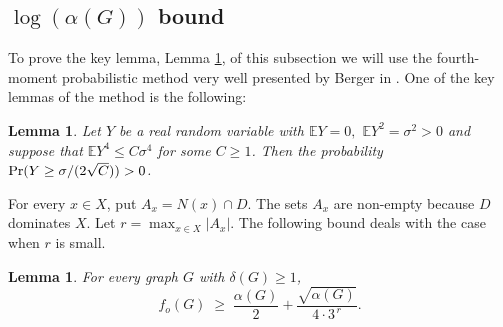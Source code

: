 \documentclass[11pt]{article}
\newtheorem{lemma}[theorem]{Lemma}
\theoremstyle{definition}
\theoremstyle{remark}
\newcommand{\E}{\mathbb E}
\newcommand{\1}{\mathbf{1}}
\begin{document}
	\subsection{$\log(\alpha(G))$ bound}
	
	To prove the key lemma, Lemma \ref{lem:bound1}, of this subsection we will use the fourth-moment probabilistic method very well presented by Berger in \cite{Berger1997}. One of the key lemmas of the method is the following:
	\begin{lemma}\label{lem:fourth-moment}\cite{Berger1997}
		Let $Y$ be a real random variable with
		$\E Y=0,$ $\E Y^2=\sigma^2>0$
		and suppose that
		$
		\E Y^4\le C\sigma^4
		$
		for some $C\ge 1$. Then the probability ${\rm Pr}(Y\ge \sigma/(2\sqrt C))>0$.
	\end{lemma}
	
	
	
	
	
	For every $x\in X$, put $A_x=N(x)\cap D.
	$
	The sets $A_x$ are non-empty because $D$ dominates $X$.  Let
	$
	r=\max_{x\in X}|A_x|.
	$
	The following bound deals with the case when $r$ is small.
	
	\begin{lemma}\label{lem:bound1}
		For every graph $G$ with $\delta(G)\geq 1$,
		\[
		f_o(G) \;\ge\; \frac{\alpha(G)}{2} + \frac{\sqrt{\alpha(G)}}{4 \cdot 3^{\,r}}.
		\]
	\end{lemma}
	
\end{document}
